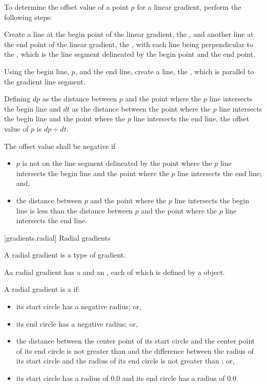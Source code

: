 \pnum
To determine the offset value of a point $p$ for a linear gradient, perform the following steps:
\begin{enumeratea}
\item Create a line at the begin point of the linear gradient, the , and another line at the end point of the linear gradient, the , with each line being perpendicular to the , which is the line segment delineated by the begin point and the end point.

\item Using the begin line, $p$, and the end line, create a line, the , which is parallel to the gradient line segment.

\item Defining $dp$ as the distance between $p$ and the point where the $p$ line intersects the begin line and $dt$ as the distance between the point where the $p$ line intersects the begin line and the point where the $p$ line intersects the end line, the offset value of $p$ is $dp \div dt$.

\item The offset value shall be negative if
\begin{itemize}
\item $p$ is not on the line segment delineated by the point where the $p$ line intersects the begin line and the point where the $p$ line intersects the end line; and,

\item the distance between $p$ and the point where the $p$ line intersects the begin line is less than the distance between $p$ and the point where the $p$ line intersects the end line.
\end{itemize}
\end{enumeratea}

 [gradients.radial] {Radial gradients}

\pnum
A radial gradient is a type of gradient.

\pnum
Aa radial gradient has a  and an , each of which is defined by a  object.

\pnum
A radial gradient is a  if:
\begin{itemize}
\item its start circle has a negative radius; or,
\item its end circle has a negative radius; or,
\item the distance between the center point of its start circle and the center point of its end circle is not greater than  and the difference between the radius of its start circle and the radius of its end circle is not greater than ; or,
\item its start circle has a radius of 0.0 and its end circle has a radius of 0.0.
\end{itemize}

